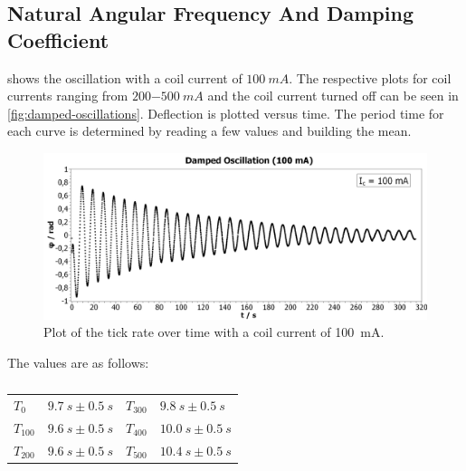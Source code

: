         \subsection{Natural Angular Frequency And Damping Coefficient}
             shows the oscillation with a coil current of \(\SI{100}{mA}\). The respective plots
            for coil currents ranging from \(\SI{200-500}{mA}\) and the coil current turned off can be seen in \cref{fig:damped-oscillations}.
            Deflection is plotted versus time. The period time for each curve is determined by reading a few values and building the mean.\par
            \begin{figure}[H]%
                \centering
                \includegraphics[width=1\linewidth]{"messdaten/Damped Oscillation (100mA)"}
                \caption[Course of the tick rate at \(I_{c}=\SI{100}{mA}\)]{Plot of the tick rate over time with a coil current of \SI{100}{mA}.}
                \label{fig:damped-oscillation-100mA}
            \end{figure}
            The values are as follows:\par
            \begin{table}[h]
                \centering
                \caption[Period times for the damped oscillations]{}
                \begin{tabular}{@{}llll@{}}
                    \toprule
                    \( T_0 \)       &$\SI{9.7}{s} \pm \SI{0.5}{s}$    &\hspace{10mm}\(T_{300}\)      &$\SI{9.8}{s} \pm \SI{0.5}{s}$\\
                    \( T_{100} \)   &$\SI{9.6}{s} \pm \SI{0.5}{s}$    &\hspace{10mm}\(T_{400}\)      &$\SI{10.0}{s} \pm \SI{0.5}{s}$\\
                    \(T_{200}\)     &$\SI{9.6}{s} \pm \SI{0.5}{s}$    &\hspace{10mm}\(T_{500}\)      &$\SI{10.4}{s} \pm \SI{0.5}{s}$\\
                    \bottomrule
                \end{tabular}
                \label{tab:period_times_damped_oscillations}
            \end{table}
